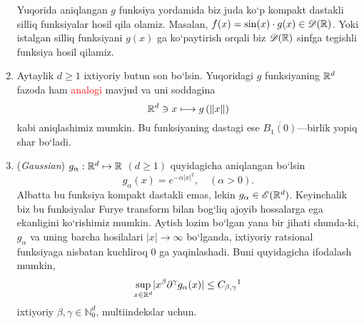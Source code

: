 \begin{example}
\begin{enumerate}
\begin{minipage}{0.89\textwidth}
\begin{minipage}[b]{0.45\textwidth}
\begin{figure}[H]
        \end{figure}
    \end{minipage}
    \end{minipage}
\break
Yuqorida aniqlangan $g$ funksiya yordamida biz juda ko`p kompakt dastakli sil\-liq funksiyalar hosil qila olamiz. Masalan, $f(x)=\sin(x)\cdot g(x)\in\mathscr{D}(\mathbb{R})$. Yoki istalgan silliq funksiyani $g(x)$ ga ko`paytirish orqali biz $\mathscr{D}(\mathbb{R})$ sinfga tegishli funksiya hosil qilamiz.

\item Aytaylik $d\ge 1$ ixtiyoriy butun son bo`lsin. Yuqoridagi $g$ funksiyaning ${\mathbb{R}^{d}}$ fazoda ham \textcolor{red}{analogi} mavjud va uni soddagina 
\begin{equation*}
    {\mathbb{R}^{d}} \ni x\longmapsto g\left(\lVert x\rVert\right)
\end{equation*}
kabi aniqlashimiz mumkin. Bu funksiyaning dastagi ese $\overline{B_1(0)}$---birlik yopiq shar bo`ladi.

\item (\emph{Gaussian}) $g_\alpha : {\mathbb{R}^{d}} \mapsto \mathbb{R}$ $(d\ge1)$ quyidagicha aniqlangan bo`lsin 
\begin{equation*}
    g_\alpha(x)=e^{-\alpha \lvert x\rvert^2}, \quad (\alpha>0).
\end{equation*}
Albatta bu funksiya kompakt dastakli emas, lekin $g_\alpha \in\mathscr{E}({\mathbb{R}^{d}})$. Keyinchalik biz bu funksiyalar Furye transform bilan bog`liq ajoyib hossalarga ega ekanligini ko`\-ri\-shi\-miz mumkin. Aytish lozim bo`lgan yana bir jihati shunda-ki, $g_\alpha$ va uning barcha hosilalari $\lvert x\rvert \to \infty$  bo`lganda, ixtiyoriy ratsional funksiyaga nisbatan kuchliroq $0$ ga yaqinlashadi. Buni quyidagicha ifodalash mumkin,
\begin{equation*}
    \sup\limits_{x\in\rd} \lvert x^\beta \partial^\gamma g_\alpha(x)\rvert \le C_{\beta,\gamma} \footnotemark
\end{equation*}
ixtiyoriy $\beta, \gamma\in \mathbb{N}_0^d$, multiindekslar uchun. 
\end{enumerate}
\end{example}

 